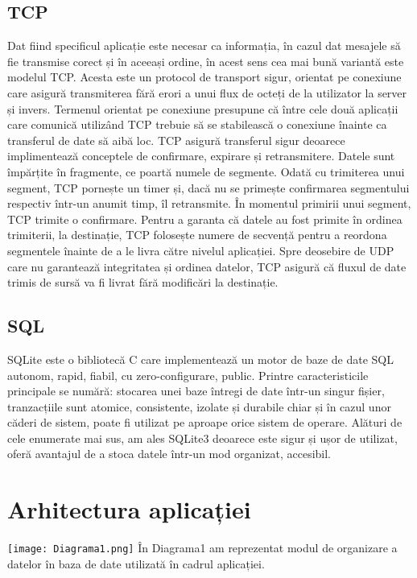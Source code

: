 \documentclass{article}
\begin{document}
\subsection{TCP}
Dat fiind specificul aplicație este necesar ca informația, în cazul dat mesajele să fie transmise corect și în aceeași ordine, în acest sens cea mai bună variantă este modelul TCP. Acesta este un protocol de transport sigur, orientat pe conexiune care asigură transmiterea fără erori a unui flux de octeți de la utilizator la server și invers. Termenul orientat pe conexiune presupune că între cele două aplicații care comunică utilizând TCP trebuie să se stabilească o conexiune înainte ca transferul de date să aibă loc. TCP asigură transferul sigur deoarece implimentează conceptele de confirmare, expirare și retransmitere. Datele sunt împărțite în fragmente, ce poartă numele de segmente. Odată cu trimiterea unui segment, TCP pornește un timer și, dacă nu se primește confirmarea segmentului respectiv într-un anumit timp, îl retransmite. În momentul primirii unui segment, TCP trimite o confirmare. Pentru a garanta că datele au fost primite în ordinea trimiterii, la destinație, TCP folosește numere de secvență pentru a reordona segmentele înainte de a le livra către nivelul aplicației. Spre deosebire de UDP care nu garantează integritatea și ordinea datelor, TCP asigură că fluxul de date trimis de sursă va fi livrat fără modificări la destinație.
\subsection{SQL}
SQLite este o bibliotecă C care implementează un motor de baze de date SQL autonom, rapid, fiabil, cu zero-configurare, public. Printre caracteristicile principale se numără: stocarea unei baze întregi de date într-un singur fișier, tranzacțiile sunt atomice, consistente, izolate și durabile chiar și în cazul unor căderi de sistem, poate fi utilizat pe aproape orice sistem de operare. Alături de cele enumerate mai sus, am ales SQLite3 deoarece este sigur și ușor de utilizat, oferă avantajul de a stoca datele într-un mod organizat, accesibil. 
\section{Arhitectura aplicației}
\texttt{[image: Diagrama1.png]}
În Diagrama1 am reprezentat modul de organizare a datelor în baza de date utilizată în cadrul aplicației.\\
\end{document}
